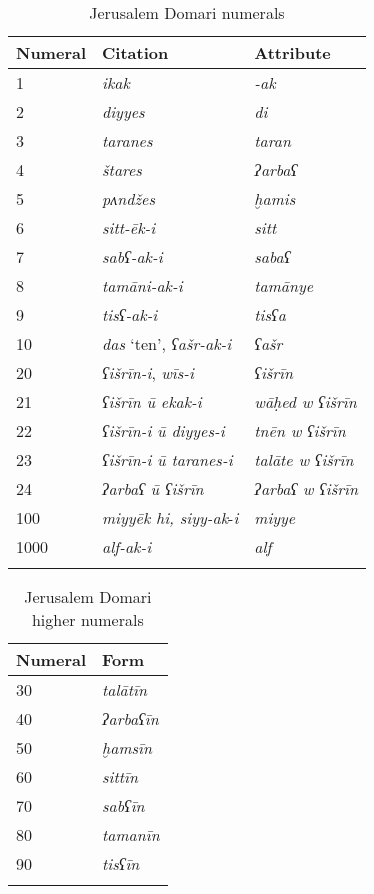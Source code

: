 \documentclass[output=paper]{langsci/langscibook}
\begin{document}
\begin{table}[p]
\begin{tabular}{lll}
\lsptoprule Numeral & Citation & Attribute\\
\midrule
1 & \textit{ikak} & \textit{-ak}\\
2 & \textit{diyyes} & \textit{di}\\
3 & \textit{taranes}  & \textit{taran}\\
4 & \textit{štares}  & \textit{ʔarbaʕ}\\
5 & \textit{pʌndžes}  & \textit{ḫamis}\\
6 & \textit{sitt-ēk-i} & \textit{sitt}\\
7 & \textit{sabʕ-ak-i} & \textit{sabaʕ}\\
8 & \textit{tamāni-ak-i} & \textit{tamānye}\\
9 & \textit{tisʕ-ak-i} & \textit{tisʕa}\\
10 & \textit{das} ‘ten’, \textit{ʕašr-ak-i} & \textit{ʕašr}\\
20 & \textit{ʕišrīn-i}, \textit{wīs-i} & \textit{ʕišrīn}\\
21 & \textit{ʕišrīn ū ekak-i} & \textit{wāḥed w ʕišrīn}\\
22 & \textit{ʕišrīn-i ū diyyes-i} & \textit{tnēn w ʕišrīn}\\
23 & \textit{ʕišrīn-i ū taranes-i} & \textit{talāte w ʕišrīn}\\
24 & \textit{ʔarbaʕ ū ʕišrīn} & \textit{ʔarbaʕ w ʕišrīn}\\
100 & \textit{miyyēk hi, siyy-ak}-\textit{i} & \textit{miyye}\\
1000 & \textit{alf-ak-i} & \textit{alf}\\
\lspbottomrule
\end{tabular}
\caption{Jerusalem Domari numerals}
\label{numerals1}
\end{table}

\begin{table}[p]
\begin{tabular}{ll}
\lsptoprule Numeral & Form\\
\midrule
30 & \textit{talātīn}\\
40 & \textit{ʔarbaʕīn}\\
50 & \textit{ḫamsīn}\\
60 & \textit{sittīn}\\
70 & \textit{sabʕīn}\\
80 & \textit{tamanīn}\\
90 & \textit{tisʕīn}\\
\lspbottomrule
\end{tabular}
\caption{Jerusalem Domari higher numerals}
\label{numerals2}
\end{table}
\end{document}
